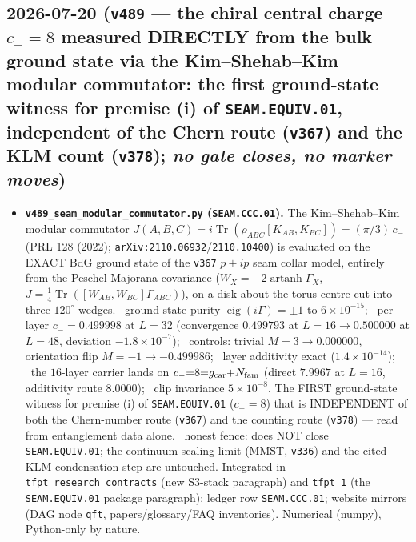 \subsection*{2026-07-20 (\texttt{v489} --- the chiral central charge $c_-{=}8$ measured DIRECTLY from the bulk ground state via the Kim--Shehab--Kim modular commutator: the first ground-state witness for premise (i) of \texttt{SEAM.EQUIV.01}, independent of the Chern route (\texttt{v367}) and the KLM count (\texttt{v378}); \emph{no gate closes, no marker moves})}
\begin{itemize}[leftmargin=1.5em]
\item \textbf{\texttt{v489\_seam\_modular\_commutator.py} (\texttt{SEAM.CCC.01}).} The Kim--Shehab--Kim
modular commutator $J(A,B,C)=i\operatorname{Tr}(\rho_{ABC}[K_{AB},K_{BC}])=(\pi/3)\,c_-$ (PRL 128 (2022);
\texttt{arXiv:2110.06932}/\texttt{2110.10400}) is evaluated on the EXACT BdG ground state of the
\texttt{v367} $p{+}ip$ seam collar model, entirely from the Peschel Majorana covariance
($W_X=-2\operatorname{artanh}\Gamma_X$, $J=\tfrac14\operatorname{Tr}([W_{AB},W_{BC}]\Gamma_{ABC})$), on a
disk about the torus centre cut into three $120^\circ$ wedges. \mE\ ground-state purity
$\operatorname{eig}(i\Gamma)=\pm1$ to $6\times10^{-15}$; \mE\ per-layer $c_-=0.499998$ at $L{=}32$
(convergence $0.499793$ at $L{=}16\to0.500000$ at $L{=}48$, deviation $-1.8\times10^{-7}$); \mE\ controls:
trivial $M{=}3\to0.000000$, orientation flip $M{=}{-}1\to-0.499986$; \mE\ layer additivity exact
($1.4\times10^{-14}$); \mE\ the $16$-layer carrier lands on $c_-{=}8{=}g_{\mathrm{car}}{+}N_{\mathrm{fam}}$ (direct $7.9967$ at
$L{=}16$, additivity route $8.0000$); \mE\ clip invariance $5\times10^{-8}$. The FIRST ground-state witness
for premise (i) of \texttt{SEAM.EQUIV.01} ($c_-{=}8$) that is INDEPENDENT of both the Chern-number route
(\texttt{v367}) and the counting route (\texttt{v378}) --- read from entanglement data alone. \mO\ honest
fence: does NOT close \texttt{SEAM.EQUIV.01}; the continuum scaling limit (MMST, \texttt{v336}) and the
cited KLM condensation step are untouched. Integrated in \texttt{tfpt\_research\_contracts} (new S3-stack
paragraph) and \texttt{tfpt\_1} (the \texttt{SEAM.EQUIV.01} package paragraph); ledger row
\texttt{SEAM.CCC.01}; website mirrors (DAG node \texttt{qft}, papers/glossary/FAQ inventories). Numerical
(numpy), Python-only by nature.
\end{itemize}

